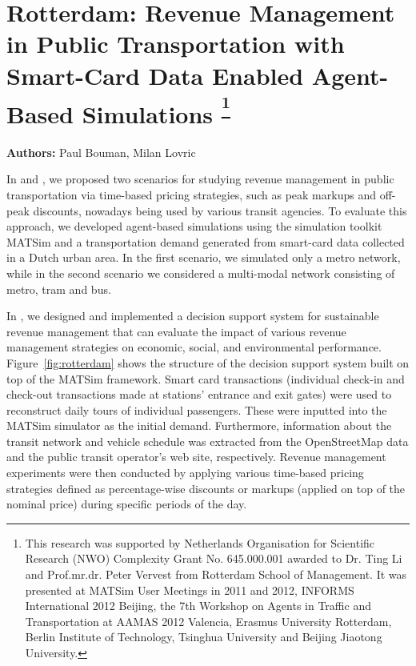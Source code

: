 \section{Rotterdam: Revenue Management in Public Transportation with Smart-Card Data Enabled Agent-Based Simulations \textsuperscript{\footnotesize{\footnote{This research was supported by Netherlands Organisation for Scientific Research (NWO)
Complexity Grant No. 645.000.001 awarded to Dr. Ting Li and Prof.mr.dr. Peter Vervest from
Rotterdam School of Management. It was presented at MATSim User Meetings in 2011 and 2012,
INFORMS International 2012 Beijing, the 7th Workshop on Agents in Traffic and Transportation at
AAMAS 2012 Valencia, Erasmus University Rotterdam, Berlin Institute of Technology, Tsinghua
University and Beijing Jiaotong University.}}}}
\label{sec:rotterdam}
\hfill \textbf{Authors:} Paul Bouman, Milan Lovric

In \citet[][]{LovricEtAl_DSS_2013} and \citet[][]{BoumanEtAl_AAMAS_2012}, we proposed two scenarios for studying revenue management in public transportation via time-based pricing strategies, such as peak markups and off-peak discounts, nowadays being used by various transit agencies. To evaluate this approach, we developed agent-based simulations using the simulation toolkit MATSim and a transportation demand generated from smart-card data collected in a Dutch urban area. In the first scenario, we simulated only a metro network, while in the second scenario we considered a multi-modal network consisting of metro, tram and bus.

In \citet[][]{LovricEtAl_DSS_2013}, we designed and implemented a decision support system for sustainable revenue management that can evaluate the impact of various revenue management strategies on economic, social, and environmental performance. Figure~\ref{fig:rotterdam} shows the structure of the decision support system built on top of the MATSim framework. Smart card transactions (individual check-in and check-out transactions made at stations' entrance and exit gates) were used to reconstruct daily tours of individual passengers. These were inputted into the MATSim simulator as the initial demand. Furthermore, information about the transit network and vehicle schedule was extracted from the OpenStreetMap data and the public transit operator's web site, respectively. Revenue management experiments were then conducted by applying various time-based pricing strategies defined as percentage-wise discounts or markups (applied on top of the nominal price) during specific periods of the day. 

